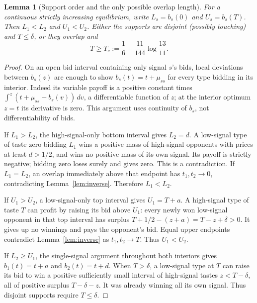 \documentclass[11pt,a4paper]{article}
\newtheorem{lemma}[theorem]{Lemma}
\theoremstyle{remark}\newtheorem{remark}[theorem]{Remark}
\begin{document}
\begin{lemma}[Support order and the only possible overlap length]\label{lem:length}
For a continuous strictly increasing equilibrium, write $L_s=b_s(0)$ and $U_s=b_s(T)$. Then $L_1<L_2$ and $U_1<U_2$. Either the supports are disjoint (possibly touching) and $T\le\delta$, or they overlap and
\[
 T\ge T_c:=\frac16+\frac{11}{144}\log\frac{13}{11}.
\]
\end{lemma}
\begin{proof}
On an open bid interval containing only signal $s$'s bids, local deviations between $b_s(z)$ are enough to show $b_s(t)=t+\mu_{ss}$ for every type bidding in its interior. Indeed its variable payoff is a positive constant times
$\int^z(t+\mu_{ss}-b_s(v))\,dv$, a differentiable function of $z$; at the interior optimum $z=t$ its derivative is zero. This argument uses continuity of $b_s$, not differentiability of bids.

If $L_1>L_2$, the high-signal-only bottom interval gives $L_2=d$. A low-signal type of taste zero bidding $L_1$ wins a positive mass of high-signal opponents with prices at least $d>1/2$, and wins no positive mass of its own signal. Its payoff is strictly negative; bidding zero loses surely and gives zero. This is a contradiction. If $L_1=L_2$, an overlap immediately above that endpoint has $t_1,t_2\to0$, contradicting Lemma~\ref{lem:inverse}. Therefore $L_1<L_2$.

If $U_1>U_2$, a low-signal-only top interval gives $U_1=T+a$. A high-signal type of taste $T$ can profit by raising its bid above $U_1$: every newly won low-signal opponent in that top interval has surplus
$T+1/2-(z+a)=T-z+\delta>0$. It gives up no winnings and pays the opponent's bid. Equal upper endpoints contradict Lemma~\ref{lem:inverse} as $t_1,t_2\to T$. Thus $U_1<U_2$.

If $L_2\ge U_1$, the single-signal argument throughout both interiors gives $b_1(t)=t+a$ and $b_2(t)=t+d$. When $T>\delta$, a low-signal type at $T$ can raise its bid to win a positive sufficiently small interval of high-signal tastes $z<T-\delta$, all of positive surplus $T-\delta-z$. It was already winning all its own signal. Thus disjoint supports require $T\le\delta$.


\end{proof}
\end{document}
